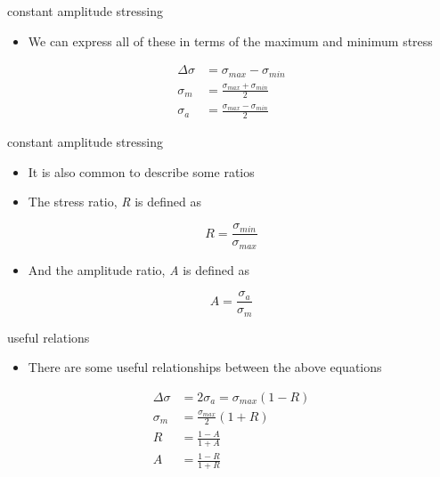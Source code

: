 \documentclass[
  letterpaper,
  ignorenonframetext,
  aspectratio=43,
  handout,
  12pt]{beamer}
\providecommand{\tightlist}{%
  \setlength{\itemsep}{0pt}\setlength{\parskip}{0pt}}
\providecommand{\tightlist}{%
\setlength{\itemsep}{0pt}\setlength{\parskip}{0pt}}
\begin{document}
\begin{frame}{constant amplitude stressing}
\protect\hypertarget{constant-amplitude-stressing-2}{}
\begin{itemize}
\tightlist
\item
  We can express all of these in terms of the maximum and minimum stress
\end{itemize}

\[\begin{aligned}
  \Delta \sigma &= \sigma_{max} - \sigma_{min}\\
  \sigma_m &= \frac{\sigma_{max} + \sigma_{min}}{2}\\
  \sigma_a &= \frac{\sigma_{max}- \sigma_{min}}{2}
\end{aligned}\]
\end{frame}

\begin{frame}{constant amplitude stressing}
\protect\hypertarget{constant-amplitude-stressing-3}{}
\begin{itemize}
\tightlist
\item
  It is also common to describe some ratios
\item
  The stress ratio, \emph{R} is defined as
\end{itemize}

\[R = \frac{\sigma_{min}}{\sigma_{max}}\]

\begin{itemize}
\tightlist
\item
  And the amplitude ratio, \emph{A} is defined as
\end{itemize}

\[A = \frac{\sigma_a}{\sigma_m}\]
\end{frame}

\begin{frame}{useful relations}
\protect\hypertarget{useful-relations}{}
\begin{itemize}
\tightlist
\item
  There are some useful relationships between the above equations
\end{itemize}

\[\begin{aligned}
  \Delta \sigma &= 2 \sigma_a = \sigma_{max}(1-R)\\
  \sigma_m &= \frac{\sigma_{max}}{2}(1+R)\\
  R &= \frac{1-A}{1+A}\\
  A &= \frac{1-R}{1+R}
\end{aligned}\]
\end{frame}
\end{document}
